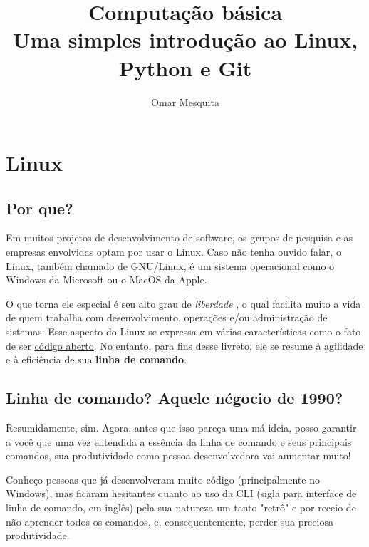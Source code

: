 \documentclass{article}
\begin{document}
	\title {Computação básica \\[1ex] \large Uma simples introdução ao Linux, Python e Git}
	\date{}
	\author{Omar Mesquita}
	\maketitle
	\thispagestyle{empty}
	
	\newpage
	\tableofcontents


	\newpage
	\section{Linux}
	\subsection{Por que?}
	
	Em muitos projetos de desenvolvimento de software, os grupos de pesquisa e as empresas envolvidas optam por  
	usar o Linux. Caso não tenha ouvido falar, o \href{https://pt.wikipedia.org/wiki/Linux}{Linux}, também chamado de GNU/Linux, é um sistema operacional como o 
	Windows da Microsoft ou o MacOS da Apple. 


	O que torna ele especial é seu alto grau de \textit{liberdade} , o qual facilita muito a vida de quem trabalha com 
	desenvolvimento, operações e/ou administração de sistemas. Esse aspecto do Linux se expressa em várias características 
	como o fato de ser \href{https://pt.wikipedia.org/wiki/C%C3%B3digo_aberto}{código aberto}. No entanto, para fins desse livreto, ele se resume à agilidade
	e à eficiência de sua \textbf{linha de comando}.

	\subsection{Linha de comando? Aquele négocio de 1990?} 

	Resumidamente, sim. Agora, antes que isso pareça uma má ideia, posso garantir a você que uma vez entendida a essência da
	linha de comando e seus principais comandos, sua produtividade como pessoa desenvolvedora vai aumentar muito! 

	Conheço pessoas que já desenvolveram muito código (principalmente no Windows), 
	mas ficaram hesitantes quanto ao uso da CLI (sigla para interface de linha de comando, em inglês) 
	pela sua natureza um tanto "retrô" e por receio de não aprender todos os comandos, e,
	consequentemente, perder sua preciosa produtividade. 
\end{document}
